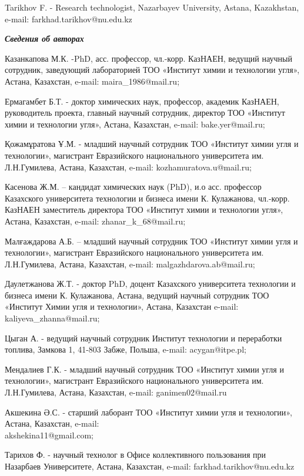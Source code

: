 \begin{authorinfo}
Tarikhov F. - Research technologist, Nazarbayev University, Astana,
Kazakhstan, e-mail: farkhad.tarikhov@nu.edu.kz

\hspace{1em}\emph{{\bfseries Сведения об авторах}}

Казанкапова М.К. -PhD, асс. профессор, чл.-корр. КазНАЕН,
ведущий научный сотрудник, заведующий лабораторией ТОО «Институт химии и
технологии угля», Астана, Казахстан, e-mail: maira\_1986@mail.ru;

Ермагамбет Б.Т. - доктор химических наук, профессор, академик КазНАЕН,
руководитель проекта, главный научный сотрудник, директор ТОО «Институт
химии и технологии угля», Астана, Казахстан,  e-mail: bake.yer@mail.ru;

Қожамұратова Ұ.М. - младший научный сотрудник ТОО «Институт химии угля и
технологии», магистрант Евразийского национального университета им.
Л.Н.Гумилева, Астана, Казахстан, e-mail: kozhamuratova.u@mail.ru;

Касенова Ж.М. -- кандидат химических наук (PhD), и.о асс. профессор
Казахского университета технологии и бизнеса имени К. Кулажанова,
чл.-корр. КазНАЕН заместитель директора ТОО «Институт химии и технологии
угля», Астана, Казахстан, e-mail: zhanar\_k\_68@mail.ru;

Малғаждарова А.Б. -- младший научный сотрудник ТОО «Институт химии угля
и технологии», магистрант Евразийского национального университета им.
Л.Н.Гумилева, Астана, Казахстан, e-mail: malgazhdarova.ab@mail.ru;

Даулетжанова Ж.Т. - доктор PhD, доцент Казахского университета
технологии и бизнеса имени К. Кулажанова, Астана, ведущий научный
сотрудник ТОО «Институт Химии угля и технологии», Астана, Казахстан
e-mail: \\kaliyeva\_zhanna@mail.ru;

Цыган А. - ведущий научный сотрудник Институт технологии и переработки
топлива, Замкова 1, 41-803 Забже, Польша, e-mail: acygan@itpe.pl;

Мендалиев Г.К. - младший научный сотрудник ТОО «Институт химии угля и
технологии», магистрант Евразийского национального университета им.
Л.Н.Гумилева, Астана, Казахстан, e-mail: ganimen02@mail.ru

Акшекина Ә.С. -  старший лаборант ТОО «Институт химии угля и
технологии», Астана, Казахстан, e-mail: \\akshekina11@gmail.com;

Тарихов Ф. - научный технолог в Офисе коллективного пользования при
Назарбаев Университете, Астана, Казахстан, e-mail: farkhad.tarikhov@nu.edu.kz
\end{authorinfo}
